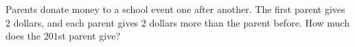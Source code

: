 Parents donate money to a school event one after another. The first parent gives $2$ dollars, and each parent gives $2$ dollars more than the parent before. How much does the $201$st parent give?
